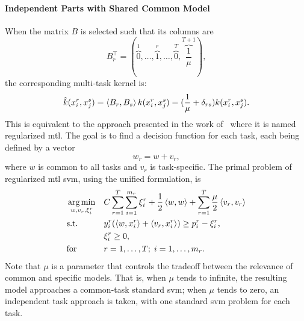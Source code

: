 \paragraph*{Independent Parts with Shared Common Model}
When the matrix $B$ is selected such that its columns are
$$B_r^\intercal =  (\overbrace{0}^1, \ldots, \overbrace{1}^{r}, \ldots,  \overbrace{0}^T, \overbrace{\frac{1}{\mu}}^{T+1}), $$
the corresponding multi-task kernel is:
\begin{equation}
    \nonumber
    \hat{k}(x_i^r, x_j^s) = \left\langle B_r, B_s \right\rangle k(x_i^r, x_j^s) = ( \frac{1}{\mu} + \delta_{rs}) k(x_i^r, x_j^s) .
\end{equation}
This is equivalent to the approach presented in the work of~\cite{EvgeniouP04} where it is named {regularized \acrshort{mtl}}.
The goal is to find a decision function for each task, each being defined by a vector
$$w_r = w + v_r,$$
where $w$ is common to all tasks and $v_r$ is task-specific.
The primal problem of {regularized \acrshort{mtl}} \acrshort{svm}, using the unified formulation, is 
\begin{equation}
    \label{eq:regmtlsvm_primal}
    \begin{aligned}
        & \argmin_{w, v_r, \xi_i^r}
        & & C \sum_{r=1}^\ntasks \sum_{i=1}^{\npertask_r} \xi_i^r + \frac{1}{2} \dotp{w}{w} + \sum_{r=1}^\ntasks \frac{\mu}{2} \dotp{v_r}{v_r} \\
        & \text{s.t.}
        & & y_{i}^r ( \dotp{w}{x_{i}^r} + \dotp{v_r}{x_{i}^r}) \geq p_i^r - \xi_i^r ,\\
        & & &\xi_i^r \geq 0, \\
        & \text{for } & & r=1, \ldots, \ntasks; \; i=1, \ldots, \npertask_r.
    \end{aligned}
\end{equation}
Note that $\mu$ is a parameter that controls the tradeoff between the relevance of common and specific models. That is, when $\mu$ tends to infinite, the resulting model approaches a common-task standard \acrshort{svm}; when $\mu$ tends to zero, an independent task approach is taken, with one standard \acrshort{svm} problem for each task.
